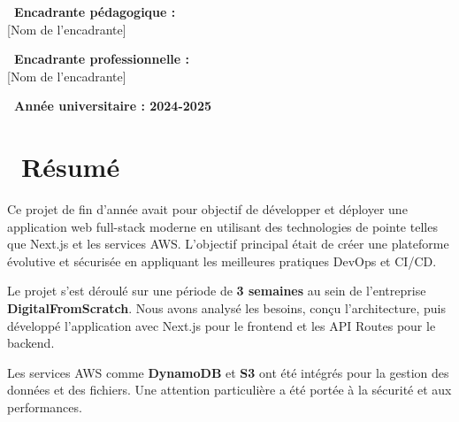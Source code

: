 \documentclass[12pt,a4paper]{report}
\begin{document}
\begin{titlepage}
    \vspace{1.5cm}
    
    \begin{minipage}{0.45\textwidth}
        \centering
        {\large\bfseries\color{primaryblue} \faChalkboardTeacher\ Encadrante pédagogique :}\\
        {\large\color{darkblue} [Nom de l'encadrante]}
    \end{minipage}
    \hfill
    \begin{minipage}{0.45\textwidth}
        \centering
        {\large\bfseries\color{primaryblue} \faBriefcase\ Encadrante professionnelle :}\\
        {\large\color{darkblue} [Nom de l'encadrante]}
    \end{minipage}
    
    \vfill
    
    \begin{tcolorbox}[colback=primaryblue, colframe=primaryblue, rounded corners=5pt]
        \centering
        {\large\bfseries\color{white} \faCalendarAlt\ Année universitaire : 2024-2025}
    \end{tcolorbox}
    
\end{titlepage}

\chapter*{\color{primaryblue}\faFileAlt\ Résumé}

\begin{infobox}
Ce projet de fin d'année avait pour objectif de développer et déployer une application web full-stack moderne en utilisant des technologies de pointe telles que Next.js et les services AWS. L'objectif principal était de créer une plateforme évolutive et sécurisée en appliquant les meilleures pratiques DevOps et CI/CD.
\end{infobox}

Le projet s'est déroulé sur une période de \textbf{\color{primaryblue}3 semaines} au sein de l'entreprise \textbf{\color{primaryblue}DigitalFromScratch}. Nous avons analysé les besoins, conçu l'architecture, puis développé l'application avec Next.js pour le frontend et les API Routes pour le backend. 

Les services AWS comme \textcolor{accentgreen}{\textbf{DynamoDB}} et \textcolor{accentgreen}{\textbf{S3}} ont été intégrés pour la gestion des données et des fichiers. Une attention particulière a été portée à la sécurité et aux performances. 
\end{document}
